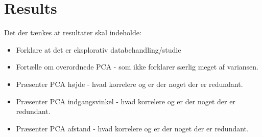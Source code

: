 \section{Results}
\label{Results2}
%
Det der tænkes at resultater skal indeholde: 
\begin{itemize}
	\item Forklare at det er eksplorativ databehandling/studie
	\item Fortælle om overordnede PCA - som ikke forklarer særlig meget af variansen.
	\item Præsenter PCA højde - hvad korrelere og er der noget der er redundant.
	\item Præsenter PCA indgangsvinkel - hvad korrelere og er der noget der er redundant.
	\item Præsenter PCA afstand - hvad korrelere og er der noget der er redundant.
\end{itemize}